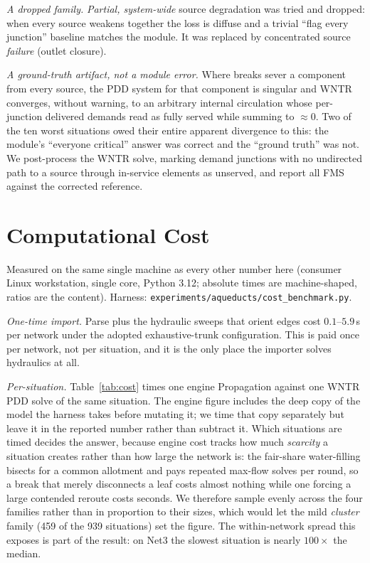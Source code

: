 \documentclass[11pt]{article}
\begin{document}
\emph{A dropped family.} \emph{Partial, system-wide} source degradation was
tried and dropped: when every source weakens together the loss is diffuse and a
trivial ``flag every junction'' baseline matches the module. It was replaced by
concentrated source \emph{failure} (outlet closure).

\emph{A ground-truth artifact, not a module error.} Where breaks sever a
component from every source, the PDD system for that component is singular and
WNTR converges, without warning, to an arbitrary internal circulation whose
per-junction delivered demands read as fully served while summing to $\approx 0$.
Two of the ten worst situations owed their entire apparent divergence to this:
the module's ``everyone critical'' answer was correct and the ``ground truth''
was not. We post-process the WNTR solve, marking demand junctions with no
undirected path to a source through in-service elements as unserved, and report
all FMS against the corrected reference.

\section{Computational Cost}\label{app:cost}

Measured on the same single machine as every other number here (consumer Linux
workstation, single core, Python 3.12; absolute times are machine-shaped, ratios
are the content). Harness: \texttt{experiments/aqueducts/cost\_benchmark.py}.

\emph{One-time import.} Parse plus the hydraulic sweeps that orient edges cost
$0.1$--$5.9$\,s per network under the adopted exhaustive-trunk configuration.
This is paid once per network, not per situation, and it is the only place the
importer solves hydraulics at all.

\emph{Per-situation.} Table~\ref{tab:cost} times one engine Propagation against
one WNTR PDD solve of the same situation. The engine figure includes the deep copy of
the model the harness takes before mutating it; we time that copy separately but leave
it in the reported number rather than subtract it. Which situations are timed decides the
answer, because engine cost tracks how much \emph{scarcity} a situation creates
rather than how large the network is: the fair-share water-filling bisects for a
common allotment and pays repeated max-flow solves per round, so a break that
merely disconnects a leaf costs almost nothing while one forcing a large
contended reroute costs seconds. We therefore sample evenly across the four
families rather than in proportion to their sizes, which would let the mild
\emph{cluster} family (459 of the 939 situations) set the figure. The
within-network spread this exposes is part of the result: on Net3 the slowest
situation is nearly $100\times$ the median.
\end{document}
